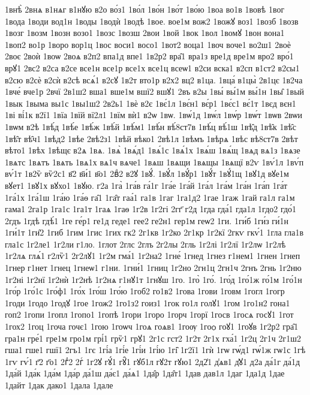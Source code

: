 {1внѣ̀
2внѧ
в1нѧг
в1нꙋю
в2о
во́з1
1во́л
1во́н
1во́т
1во́ю
1воа
во1в
1вовѣ
1вог
1вода
1води
вод1н
1воды
1водѝ
1водѣ
1вое.
вое1м
вож2
1вожꙋ
воз1
1возб
1возв
1возг
1возм
1возн
возо1
1возс
1возш
2вои
1вой
1вок
1вол
1вомꙋ
1вон
вона1
1воп2
во1р
1воро
вор1ц
1вос
воси1
восо1
1вот2
воца1
1воч
воче1
во2ш1
2воѐ
2воє
2воѝ
1воѡ
2воѧ
в2п2
впа1д
впе1
1в2р2
вра̑1
вра1з
вре1д
вре1м
вро2
вро́1
врꙋ1
2вс2
в2са
в2се
все1н
все1р
все1х
все1ц
всеѡ1
в2си
вска1
в2сп
в1ст2
в2сы1
в2сю
в2сѐ
в2сѝ
в2сѣ
всѧ́1
в2сꙋ
1в2т
вто1р
в2х2
вц2
в1ца.
1вца́
в1цы̀
2в1цє
1в2ча
1вче́
вче1р
2вчї
2в1ш2
вша1
вше1м
вшї2
вшꙋ1
2въ
в2ы
1вы́
вы́1м
вы́1н
1вы̑
1вый
1вык
1выма
вы1с
1вы1ш2
2в2ь1
1вѐ
в2є
1вє́1л
1вє́н1
вє́р1
1вє́с1
вє́1т
1вєд
вєн1
1ві
ві́1к
в2ї1
1вїа
1вїй
вї2л1
1вїм
вѝ1
в2ѡ
1вѡ.
1вѡ́1д
1вѡ́л
1вѡ́р
1вѡ́т
1вѡв
2вѡи
1вѡм
в2ѣ
1вѣ́д
1вѣ́е
1вѣ́ж
1вѣ́й
1вѣ́м1
1вѣ́н
вѣ́8ст7в
1вѣ́ц
вѣ́1ш
1вѣ̑д
1вѣ̑к
1вѣ̑с
1вѣ̑т
вѣ̑ч1
1вѣд2
1вѣе
2вѣ2з1
1вѣй
вѣко1
2вѣ1л
1вѣмъ
1вѣрѧ
1вѣс
вѣ8ст7в
2вѣт
вѣто1
1вѣх
1вѣщє
в2ѧ
1вѧ.
1вѧ̀
1вѧ́д1
1вѧ́1с
1вѧ́1х
1вѧ́ш
1вѧ́щ
1вѧд
вѧ1з
1вѧзе
1вѧтс
1вѧтъ
1вѧть
1вѧ1х
вѧ1ч
вѧче1
1вѧш
1вѧщи
1вѧщы
1вѧщї
в2ѵ
1вѵ́1л
1вѵ́п
вѵ́1т
1в2ѷ
вѷ2с1
в҃2
в҃и́1
в҃о1
2вⷣ2
в2ꙋ
1вꙋ́.
1вꙋ́л
1вꙋ́р1
1вꙋ́т
1вꙋ́1щ
1вꙋ1д
вꙋе1м
вꙋет1
1вꙋ1х
вꙋхо1
1вꙋю.
г2а
1га̀
1га́в
га́1г
1га́е
1га́й
1га́л
1га́м
1га́н
1га́п
1га́т
1га́1х
1га́1ш
1га́ю
1га́ѳ
га̑1
1га̑т
гаа́1
га1в
1гаг
1га1д2
1гае
1гаж
1гай
га1л
га1м
гама1
2га1р
1га1с
1га1т
1гаѧ
1гаѳ
1г2в
1г2гі
2гг҃
г2д
1гда
гда́1
гда1л
1гдо2
гдо́1
2гдъ
1гдѣ
гдѣ́1
1ге
ге́р1
ге1д
геде1
гее2
ге2н1
гер1м
геѡ2
1ги.
1ги́б
1ги́з
ги́1н
1ги́1т
1ги̑2
1гиб
1гим
1гис
1гих
гк2
2г1кв
1г2ко
2г1кр
1г2кї
2гкѵ
гкѵ́1
1гла
гла1в
гла1с
1г2ле1
1г2ли
г1ло.
1глот
2глс
2глъ
2г2лы
2гль
1г2лі
1г2лї
1г2лѡ
1г2лѣ
1г2лѧ
глѧ́1
г2лѷ1
2г2лꙋ1
1г2м
гма́1
1г2на2
1гне́
1гнед
1гнез
г1нем1
1гнен
1гнеп
1гнер
г1нет
1гнец
1гнеѡ1
г1ни.
1гни́1
1гниц
1г2но
2гн1ц
2гн1ч
2гнъ
2гнь
1г2ню
1г2ні
1г2нї
1г2нѝ
1г2нѣ
1г2нѧ
г1нꙋ1т
1гнꙋш
1го.
1го̀
1го́.
1го́д
1го́1ж
го́1м
1го́1н
1го́р
1го́1с
1го́ф1
1го́х
1го́ш
1го́ю
1гоб2
го1в2
1гова
1гови
1говм
1гогл
1гогр
1годи
1годо
1годꙋ
1гое
1гож2
1го1з2
гоиз1
1гок
го1л
голꙋ1
1гом
1го1н2
гона1
гоп2
1гопи
1гопл
1гопо1
1гопѣ
1гори
1горо
1горч
1горї
1госв
1госѧ
госꙋ1
1гот
1гох2
1гоц
1гоча
гочє1
1гою
1гоѡч
1гоѧ
гоѧв1
1гоѹ
1гоѻ
гоꙋ1
1гоꙋв
1г2р2
гра̑1
гра1н
гре́1
гре1м
гро1м
грі́1
грѷ1
грꙋ1
2г1с
гст2
1г2т
2г1х
гха́1
1г2ц
2г1ч
2г1ш2
гша1
гше1
гшї1
2гъ1
1гє
1гі́а
1гі́е
1гі́и
1гі́ю
1гі̑
1г2ї1
1гѝ
1гѡ
гѡ́д1
гѡ́1ж
гѡ1с
1гѣ
1гѵ
гѵ́1
г҃2
г҃о1
2гⷣ2
2гⷭ
1г2ꙋ
гꙋ́1
гꙋ̑1
гꙋб1л
гꙋ2т
гꙋю1
2д2̾1
д̾ѧв1
д̾ꙋ1
д2а
да́1г
да́1д
1да́й
1да́к
1да́м
1да́р
да́1ш
да́є1
да́ѧ1
1да̑р
1да̑т1
1дав
дав1л
1даг
1да1д
1дае
1дайт
1дак
дако1
1дала
1дале
}
